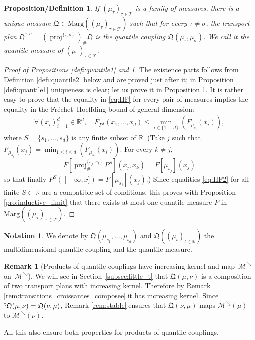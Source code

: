 \documentclass[10pt,a4paper]{article}
\theoremstyle{plain}
\newtheorem{prodefinition}[them]{Proposition/Definition}
\theoremstyle{definition}
\newtheorem{notation}[them]{Notation} %
\newtheorem{rem}[them]{Remark}
\newcommand{\como}{\mathfrak{Q}}
\newcommand{\Tt}{{\mathcal T}}
\newcommand{\trans}{{}^{\mathrm{t}}\mkern-1mu}
\newcommand{\ma}{\mathrm{Marg}}
\newcommand{\R}{\mathbb{R}}
\newcommand{\pr}{\operatorname{proj}}
\newcommand{\mdec}{\mathcal{M}^{\scriptscriptstyle\searrow}}
\newcommand{\op}{\mathopen}
\begin{document}
\begin{prodefinition}\label{defi:quantile_process}If $(\mu_\tau)_{\tau\in\Tt}$ is a family of measures, there is a unique measure $\como\in \ma((\mu_{\tau})_{\tau\in\Tt})$ such that for every $\tau\neq\sigma$, the transport plan $\como^{\tau,\sigma}=(\pr^{\{\tau,\sigma\}})_\#\como$ is the quantile coupling $\como(\mu_\tau,\mu_\sigma)$. We call it the \emph{quantile measure} of $(\mu_\tau)_{\tau\in\Tt}$.
\end{prodefinition}

\begin{proof}[Proof of Propositions \ref{defi:quantile1} and \ref{defi:quantile_process}] The existence parts follows from Definition \ref{defi:quantile2} below and are proved just after it; in Proposition \ref{defi:quantile1} uniqueness is clear; let us prove it in Proposition \ref{defi:quantile_process}. It is rather easy to prove that the equality in \eqref{eq:HF} for every pair of measures implies the equality in the Fréchet--Hoeffding bound of general dimension:
\begin{align}\label{eq:HF2}
\forall(x_i)_{i=1}^d\in\R^d,\quad F_{P^S}(x_1,\ldots,x_d)\leq \min_{i\in\{1\,\ldots,d\}}(F_{\mu_{s_i}}(x_i)),
\end{align}
where $S=\{s_1,\ldots,s_d\}$ is any finite subset of $\R$. (Take $j$ such that $F_{\mu_{s_j}}(x_j)=\min_{1\leq i\leq d}(F_{\mu_{s_i}}(x_i))$. For every $k\neq j$,
\[
F[\pr^{\{s_j,s_k\}}_\#P^S](x_j,x_k)=F[\mu_{s_j}](x_j)
\]
so that finally $P^S(\op]-\infty,x])=F[\mu_{s_j}](x_j)$.) Since equalities \eqref{eq:HF2} for all finite $S\subset\R$ are a compatible set of conditions, this proves with Proposition \ref{pro:inductive_limit} that there exists at most one quantile measure $P$ in $\ma((\mu_\tau)_{\tau\in\Tt})$.
\end{proof}

\begin{notation}\label{not:multi} We denote by $\como(\mu_{s_1},\ldots,\mu_{s_d})$ and $\como((\mu_t)_{t\in \R})$ the multidimensional quantile coupling and the quantile measure.
\end{notation}

\begin{rem}[Products of quantile couplings have increasing kernel and map~$\mdec$ on~$\mdec$]\label{rem:quantile_transitions_croissantes}
We will see in Section~\ref{subsec:little_t} that $\como(\mu,\nu)$ is a composition of two transport plans with increasing kernel. Therefore by Remark \ref{rem:transitions_croissantes_composee} it has increasing kernel. Since $\trans \como(\mu,\nu)=\como(\nu,\mu)$, Remark \ref{rem:stable} ensures that $\como(\nu,\mu)$ maps $\mdec(\mu)$ to $\mdec(\nu)$.

All this also ensure both properties for products of quantile couplings.
\end{rem}
\end{document}
